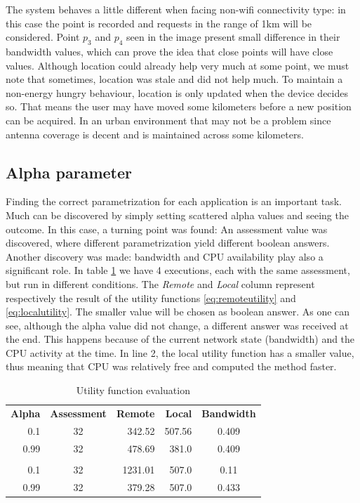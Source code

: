 \documentclass[10pt, conference, letterpaper]{IEEEtran}
\begin{document}
  The system behaves a little different when facing non-wifi connectivity type: in this case the point is recorded and requests in the range of 1km will be considered. Point $p_3$ and $p_4$ seen in the image present small difference in their bandwidth values, which can prove the idea that close points will have close values. Although location could already help very much at some point, we must note that sometimes, location was stale and did not help much. To maintain a non-energy hungry behaviour, location is only updated when the device decides so. That means the user may have moved some kilometers before a new position can be acquired. In an urban environment that may not be a problem since antenna coverage is decent and is maintained across some kilometers.

  \subsection{Alpha parameter}

  Finding the correct parametrization for each application is an important task. Much can be discovered by simply setting scattered alpha values and seeing the outcome. In this case, a turning point was found: An assessment value was discovered, where different parametrization yield different boolean answers. Another discovery was made: bandwidth and CPU availability play also a significant role. In table \ref{table:alpha} we have 4 executions, each with the same assessment, but run in different conditions. The \textit{Remote} and \textit{Local} column represent respectively the result of the utility functions \ref{eq:remoteutility} and \ref{eq:localutility}. The smaller value will be chosen as boolean answer. As one can see, although the alpha value did not change, a different answer was received at the end. This happens because of the current network state (bandwidth) and the CPU activity at the time. In line 2, the local utility function has a smaller value, thus meaning that CPU was relatively free and computed the method faster.

  \begin{table}[!t]
  \centering
  \caption{Utility function evaluation}
  \label{table:alpha}
  \begin{tabular}{rcrrc}
    \textbf{Alpha} & \textbf{Assessment} & \textbf{Remote} & \textbf{Local} & \textbf{Bandwidth} \\
   0.1 & 32  & 342.52 & 507.56 & 0.409  \\
   0.99 & 32  & 478.69 & 381.0 & 0.409  \\
   &  & & &  \\
   0.1 & 32  & 1231.01 & 507.0 & 0.11  \\
   0.99 & 32  & 379.28 & 507.0 & 0.433  \\
  \end{tabular}
  \end{table}
\end{document}
